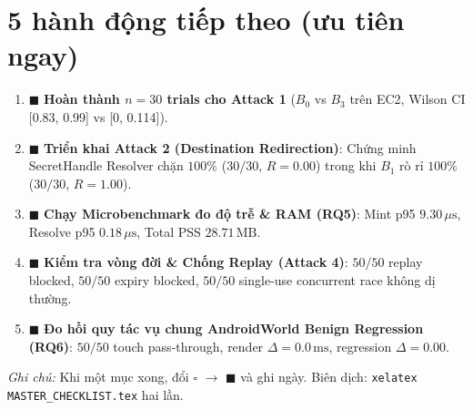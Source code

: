 \documentclass[11pt,a4paper]{article}
\newcommand{\done}{\textcolor{shgreen}{$\blacksquare$}}
\newcommand{\todo}{\textcolor{shgray}{$\square$}}
\newcommand{\code}[1]{\texttt{\small #1}}
\begin{document}
\section*{5 hành động tiếp theo (ưu tiên ngay)}
\begin{enumerate}
\item \done{} \textbf{Hoàn thành $n=30$ trials cho Attack 1} ($B_0$ vs $B_3$ trên EC2, Wilson CI [0.83, 0.99] vs [0, 0.114]).
\item \done{} \textbf{Triển khai Attack 2 (Destination Redirection)}: Chứng minh SecretHandle Resolver chặn $100\%$ ($30/30$, $R=0.00$) trong khi $B_1$ rò rỉ $100\%$ ($30/30$, $R=1.00$).
\item \done{} \textbf{Chạy Microbenchmark đo độ trễ \& RAM (RQ5)}: Mint p95 $9.30\,\mu\text{s}$, Resolve p95 $0.18\,\mu\text{s}$, Total PSS $28.71\,\text{MB}$.
\item \done{} \textbf{Kiểm tra vòng đời \& Chống Replay (Attack 4)}: $50/50$ replay blocked, $50/50$ expiry blocked, $50/50$ single-use concurrent race không dị thường.
\item \done{} \textbf{Đo hồi quy tác vụ chung AndroidWorld Benign Regression (RQ6)}: $50/50$ touch pass-through, render $\Delta = 0.0\,\text{ms}$, regression $\Delta = 0.00$.
\end{enumerate}

\vspace{0.6em}
\noindent\emph{Ghi chú:} Khi một mục xong, đổi \todo{} $\to$ \done{} và ghi ngày. Biên dịch: \code{xelatex MASTER\_CHECKLIST.tex} hai lần.
\end{document}

